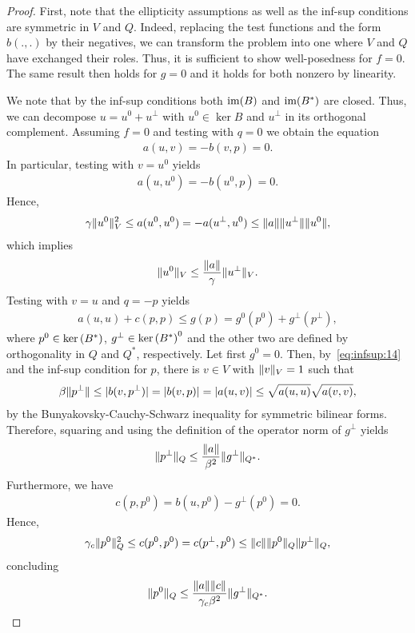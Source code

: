 \begin{proof}
  First, note that the ellipticity assumptions as well as the inf-sup
  conditions are symmetric in $V$ and $Q$. Indeed, replacing the test
  functions and the form $b(.,.)$ by their negatives, we can transform
  the problem into one where $V$ and $Q$ have exchanged their
  roles. Thus, it is sufficient to show well-posedness for $f=0$. The
  same result then holds for $g=0$ and it holds for both nonzero by
  linearity.
  
  We note that by the inf-sup conditions both $\operatorname{im}(B)$ and
  $\operatorname{im}(B^*)$ are closed. Thus, we can decompose $u=u^0+u^\perp$
  with $u^0\in\ker B$ and $u^\perp$ in its orthogonal
  complement. Assuming $f=0$ and testing with $q=0$ we obtain the
  equation
  \begin{gather}
    \label{eq:infsup:14}
    a(u,v) = -b(v,p) = 0.
  \end{gather}
  In particular, testing with $v=u^0$ yields
  \begin{gather}
    a(u,u^0) = -b(u^0,p) = 0.
  \end{gather}
  Hence,
  \begin{gather}
    \gamma \lVert u^0\rVert^2_V \le a(u^0,u^0)
    = -a(u^\perp,u^0)
    \le \lVert a\rVert \lVert u^\perp\rVert\lVert u^0\rVert,
  \end{gather}
  which implies
  \begin{gather}
    \label{eq:infsup:15}
    \lVert u^0\rVert_V \le \frac{\lVert a\rVert}{\gamma} \lVert u^\perp\rVert_V.
  \end{gather}
  Testing with $v=u$ and $q=-p$ yields
  \begin{gather}
    a(u,u)+c(p,p) \le g(p) = g^0(p^0) + g^\perp(p^\perp),
  \end{gather}
  where $p^0\in \operatorname{ker}\left(B^*\right)$, $g^\perp\in \operatorname{ker}\left(B^*\right)^0$ and the
  other two are defined by orthogonality in $Q$ and $Q^*$,
  respectively. Let first $g^0=0$. Then, by~\eqref{eq:infsup:14} and
  the inf-sup condition for $p$, there is $v\in V$ with $\lVert v\rVert_V = 1$
  such that
  \begin{gather}
    \beta \lVert p^\perp\rVert \le
    \lvert b(v,p^\perp)\rvert = \lvert b(v,p)\rvert = \lvert a(u,v)\rvert
    \le \sqrt{a(u,u)}\sqrt{a(v,v)},
  \end{gather}
  by the Bunyakovsky-Cauchy-Schwarz inequality for symmetric bilinear
  forms.  Therefore, squaring and using the definition of the operator
  norm of $g^\perp$ yields
  \begin{gather}
    \lVert p^\perp\rVert_Q \le \frac{\lVert a\rVert}{\beta^2}\lVert g^\perp\rVert_{Q^*}.
  \end{gather}
  Furthermore, we have
  \begin{gather}
    c(p,p^0) = b(u,p^0) - g^\perp(p^0) = 0.
  \end{gather}
  Hence,
  \begin{gather}
    \gamma_c \lVert p^0\rVert_Q^2 \le c(p^0,p^0)
    = c(p^\perp,p^0) \le \lVert c\rVert \lVert p^0\rVert_Q \lVert p^\perp\rVert_Q,
  \end{gather}
  concluding
  \begin{gather}
    \lVert p^0\rVert_Q
    \le \frac{\lVert a\rVert \lVert c\rVert}{\gamma_c\beta^2}
    \lVert g^\perp\rVert_{Q^*}.
  \end{gather}


\end{proof}
